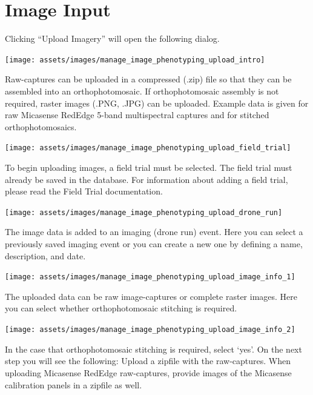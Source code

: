 \documentclass[
  12pt,
]{book}
\begin{document}
\hypertarget{image-input}{%
\section{Image Input}\label{image-input}}

Clicking ``Upload Imagery'' will open the following dialog.

\begin{center}\texttt{[image: assets/images/manage\_image\_phenotyping\_upload\_intro]} \end{center}

Raw-captures can be uploaded in a compressed (.zip) file so that they can be assembled into an orthophotomosaic. If orthophotomosaic assembly is not required, raster images (.PNG, .JPG) can be uploaded. Example data is given for raw Micasense RedEdge 5-band multispectral captures and for stitched orthophotomosaics.

\begin{center}\texttt{[image: assets/images/manage\_image\_phenotyping\_upload\_field\_trial]} \end{center}

To begin uploading images, a field trial must be selected. The field trial must already be saved in the database. For information about adding a field trial, please read the Field Trial documentation.

\begin{center}\texttt{[image: assets/images/manage\_image\_phenotyping\_upload\_drone\_run]} \end{center}

The image data is added to an imaging (drone run) event. Here you can select a previously saved imaging event or you can create a new one by defining a name, description, and date.

\begin{center}\texttt{[image: assets/images/manage\_image\_phenotyping\_upload\_image\_info\_1]} \end{center}

The uploaded data can be raw image-captures or complete raster images. Here you can select whether orthophotomosaic stitching is required.

\begin{center}\texttt{[image: assets/images/manage\_image\_phenotyping\_upload\_image\_info\_2]} \end{center}

In the case that orthophotomosaic stitching is required, select `yes'. On the next step you will see the following: Upload a zipfile with the raw-captures. When uploading Micasense RedEdge raw-captures, provide images of the Micasense calibration panels in a zipfile as well.
\end{document}
